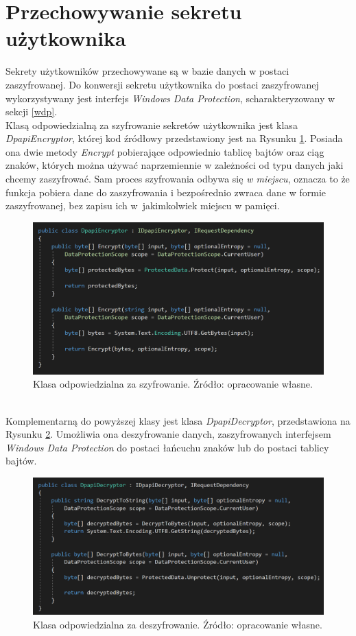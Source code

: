 \section{Przechowywanie sekretu użytkownika}
Sekrety użytkowników przechowywane są w bazie danych w postaci zaszyfrowanej. 
Do konwersji sekretu użytkownika do postaci zaszyfrowanej wykorzystywany 
jest interfejs \textit{Windows Data Protection}, scharakteryzowany w sekcji \ref{wdp}. \\
Klasą odpowiedzialną za szyfrowanie sekretów użytkownika jest klasa \textit{DpapiEncryptor}, której
kod źródłowy przedstawiony jest na Rysunku \ref{code-encrypt}. Posiada ona dwie metody \textit{Encrypt}
pobierające odpowiednio tablicę bajtów oraz ciąg znaków, których można używać naprzemiennie w zależności 
od typu danych jaki chcemy zaszyfrować. Sam proces szyfrowania odbywa się \textit{w miejscu}, oznacza to że 
funkcja pobiera dane do zaszyfrowania i bezpośrednio zwraca dane w formie zaszyfrowanej, bez zapisu ich 
w~jakimkolwiek miejscu w pamięci.
\begin{figure}[t]
    \centering
	\includegraphics[width=\textwidth]{content/images/code-encrypt}
    \caption{Klasa odpowiedzialna za szyfrowanie. Źródło: opracowanie własne.}
    \label{code-encrypt}
\end{figure} \\
Komplementarną do powyższej klasy jest klasa \textit{DpapiDecryptor}, przedstawiona na Rysunku \ref{code-decrypt}. 
Umożliwia ona deszyfrowanie danych, zaszyfrowanych interfejsem \textit{Windows Data Protection} do 
postaci łańcuchu znaków lub do postaci tablicy bajtów.
\begin{figure}[t]
    \centering
	\includegraphics[width=\textwidth]{content/images/code-decrypt}
    \caption{Klasa odpowiedzialna za deszyfrowanie. Źródło: opracowanie własne.}
    \label{code-decrypt}
\end{figure}

